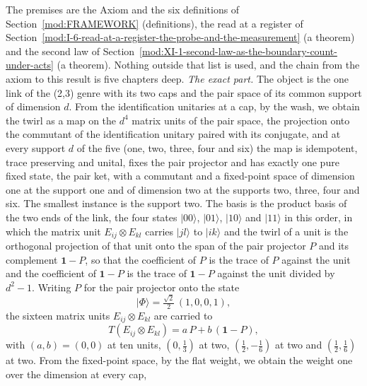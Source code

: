 \begin{chproof}
The premises are the Axiom and the six definitions of Section~\ref{mod:FRAMEWORK} (definitions), the read at a register of Section~\ref{mod:I-6-read-at-a-register-the-probe-and-the-measurement} (a theorem) and the second law of Section~\ref{mod:XI-1-second-law-as-the-boundary-count-under-acts} (a theorem). Nothing outside that list is used, and the chain from the axiom to this result is five chapters deep.
\emph{The exact part.} The object is the one link of the (2,3) genre with its two caps and the pair space of its common support of dimension $d$. From the identification unitaries at a cap, by the wash, we obtain the twirl as a map on the $d^{4}$ matrix units of the pair space, the projection onto the commutant of the identification unitary paired with its conjugate, and at every support $d$ of the five (one, two, three, four and six) the map is idempotent, trace preserving and unital, fixes the pair projector and has exactly one pure fixed state, the pair ket, with a commutant and a fixed-point space of dimension one at the support one and of dimension two at the supports two, three, four and six. The smallest instance is the support two. The basis is the product basis of the two ends of the link, the four states $\lvert 00 \rangle$, $\lvert 01 \rangle$, $\lvert 10 \rangle$ and $\lvert 11 \rangle$ in this order, in which the matrix unit $E_{ij} \otimes E_{kl}$ carries $\lvert jl \rangle$ to $\lvert ik \rangle$ and the twirl of a unit is the orthogonal projection of that unit onto the span of the pair projector $P$ and its complement $\mathbf{1} - P$, so that the coefficient of $P$ is the trace of $P$ against the unit and the coefficient of $\mathbf{1} - P$ is the trace of $\mathbf{1} - P$ against the unit divided by $d^{2} - 1$. Writing $P$ for the pair projector onto the state
\begin{equation}
\lvert \Phi \rangle = \tfrac{\sqrt{2}}{2}\,(1, 0, 0, 1),
\end{equation}
the sixteen matrix units $E_{ij} \otimes E_{kl}$ are carried to
\begin{equation}
T(E_{ij} \otimes E_{kl}) = a \, P + b \, (\mathbf{1} - P) ,
\end{equation}
with $(a, b) = (0, 0)$ at ten units, $(0, \tfrac{1}{3})$ at two, $(\tfrac{1}{2}, -\tfrac{1}{6})$ at two and $(\tfrac{1}{2}, \tfrac{1}{6})$ at two. From the fixed-point space, by the flat weight, we obtain the weight one over the dimension at every cap,
\begin{equation}

\end{equation}
\end{chproof}
